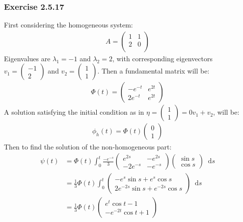 \documentclass[12pt, letterpaper]{scrartcl}
\newcommand*\diff{\mathop{}\!\mathrm{d}}
\begin{document}
\subsubsection*{Exercise 2.5.17}
First considering the homogeneous system:
\begin{align*}
    A=
    \left(\begin{array}{cc}
        1 & 1 \\
        2 & 0 \\
    \end{array}\right)
\end{align*}
Eigenvalues are $\lambda_1=-1$ and $\lambda_2=2$, with corresponding eigenvectors $v_1=\left(\begin{array}{c}-1\\2\end{array}\right)$ and $v_2=\left(\begin{array}{c}1\\1\end{array}\right)$. Then a fundamental matrix will be:
\begin{align*}
    \Phi(t)=
    \left(\begin{array}{cc}
        -e^{-t} & e^{2t} \\
        2e^{-t} & e^{2t}
    \end{array}\right)
\end{align*}
A solution satisfying the initial condition as in $\eta=\left(\begin{array}{c}1\\1\end{array}\right)=0v_1+v_2$, will be:
\begin{align*}
    \phi_h(t)=\Phi(t)\left(\begin{array}{c}0\\1\end{array}\right)
\end{align*}
Then to find the solution of the non-homogeneous part:
\begin{align*}
    \psi(t)&=\Phi(t)\int_0^t
    \frac{-e^{-s}}{3}\left(\begin{array}{cc}
        e^{2s} & -e^{2s} \\
        -2e^{-s} & -e^{-s}
    \end{array}\right)
    \left(\begin{array}{c}\sin s\\\cos s\end{array}\right)\diff s\\
    &=\frac{1}{3}\Phi(t)\int_0^t
    \left(\begin{array}{c}
        -e^{s}\sin s+e^{s}\cos s\\
        2e^{-2s}\sin s+e^{-2s}\cos s
    \end{array}\right)\diff s\\
    &=\frac{1}{3}\Phi(t)
    \left(\begin{array}{c}
        e^{t}\cos t -1\\
        -e^{-2t}\cos t+1
    \end{array}\right)
\end{align*}
\end{document}
